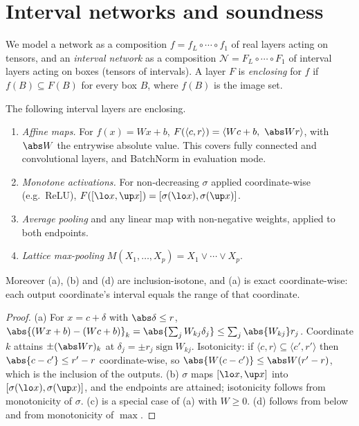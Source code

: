 \section{Interval networks and soundness}
\label{sec:networks}

We model a network as a composition $f=f_L\circ\cdots\circ f_1$ of real layers acting on tensors, and an \emph{interval network} as a composition $\mathcal N=F_L\circ\cdots\circ F_1$ of interval layers acting on boxes (tensors of intervals). A layer $F$ is \emph{enclosing} for $f$ if $f(B)\subseteq F(B)$ for every box $B$, where $f(B)$ is the image set.

\begin{lemma}\label{lem:layers}
The following interval layers are enclosing.
\begin{enumerate}[label=(\alph*)]
\item \emph{Affine maps.} For $f(x)=Wx+b$, $F(\langle c,r\rangle)=\langle Wc+b,\ \abs Wr\rangle$, with $\abs W$ the entrywise absolute value. This covers fully connected and convolutional layers, and BatchNorm in evaluation mode.
\item \emph{Monotone activations.} For non-decreasing $\sigma$ applied coordinate-wise (e.g.\ ReLU), $F([\lo x,\up x])=[\sigma(\lo x),\sigma(\up x)]$.
\item \emph{Average pooling} and any linear map with non-negative weights, applied to both endpoints.
\item \emph{Lattice max-pooling} $M(X_1,\dots,X_p)=X_1\vee\cdots\vee X_p$.
\end{enumerate}
Moreover (a), (b) and (d) are inclusion-isotone, and (a) is exact coordinate-wise: each output coordinate's interval equals the range of that coordinate.
\end{lemma}

\begin{proof}
(a) For $x=c+\delta$ with $\abs\delta\le r$, $\abs{(Wx+b)-(Wc+b)}_k=\abs{\sum_jW_{kj}\delta_j}\le\sum_j\abs{W_{kj}}r_j$. Coordinate $k$ attains $\pm(\abs Wr)_k$ at $\delta_j=\pm r_j\operatorname{sign}W_{kj}$. Isotonicity: if $\langle c,r\rangle\subseteq\langle c',r'\rangle$ then $\abs{c-c'}\le r'-r$ coordinate-wise, so $\abs{W(c-c')}\le\abs W(r'-r)$, which is the inclusion of the outputs. (b) $\sigma$ maps $[\lo x,\up x]$ into $[\sigma(\lo x),\sigma(\up x)]$, and the endpoints are attained; isotonicity follows from monotonicity of $\sigma$. (c) is a special case of (a) with $W\ge0$. (d) follows from  below and from monotonicity of $\max$.
\end{proof}

